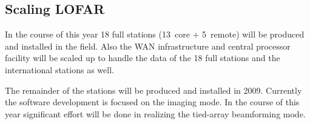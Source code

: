 \documentclass[journal]{IEEEtran}
\begin{document}
\subsection{Scaling LOFAR}
In the course of this year 18 full stations (13~core + 5~remote) will be produced and installed in the field. Also the WAN infrastructure and central processor facility will be scaled up to handle the data of the 18 full stations and the international stations as well. 

The remainder of the stations will be produced and installed in 2009. Currently the software development is focused on the imaging mode. In the course of this year significant effort will be done in realizing the tied-array beamforming mode.



%



\section{}
\end{document}
